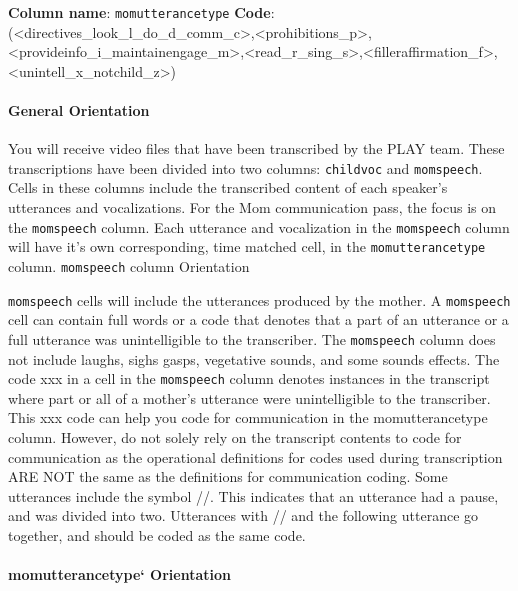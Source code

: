 \documentclass[
  12pt,
]{book}
\begin{document}
\textbf{Column name}: \texttt{momutterancetype}
\textbf{Code}: (\textless directives\_look\_l\_do\_d\_comm\_c\textgreater,\textless prohibitions\_p\textgreater,\textless provideinfo\_i\_maintainengage\_m\textgreater,\textless read\_r\_sing\_s\textgreater,\textless filleraffirmation\_f\textgreater,\textless unintell\_x\_notchild\_z\textgreater)

\hypertarget{general-orientation}{%
\paragraph*{General Orientation}\label{general-orientation}}

You will receive video files that have been transcribed by the PLAY team. These transcriptions have been divided into two columns: \texttt{childvoc} and \texttt{momspeech}. Cells in these columns include the transcribed content of each speaker's utterances and vocalizations. For the Mom communication pass, the focus is on the \texttt{momspeech} column. Each utterance and vocalization in the \texttt{momspeech} column will have it's own corresponding, time matched cell, in the \texttt{momutterancetype} column.
\texttt{momspeech} column Orientation

\texttt{momspeech} cells will include the utterances produced by the mother. A \texttt{momspeech} cell can contain full words or a code that denotes that a part of an utterance or a full utterance was unintelligible to the transcriber. The \texttt{momspeech} column does not include laughs, sighs gasps, vegetative sounds, and some sounds effects.
The code xxx in a cell in the \texttt{momspeech} column denotes instances in the transcript where part or all of a mother's utterance were unintelligible to the transcriber. This xxx code can help you code for communication in the momutterancetype column. However, do not solely rely on the transcript contents to code for communication as the operational definitions for codes used during transcription ARE NOT the same as the definitions for communication coding.
Some utterances include the symbol //. This indicates that an utterance had a pause, and was divided into two. Utterances with // and the following utterance go together, and should be coded as the same code.

\hypertarget{momutterancetype-orientation}{%
\paragraph*{momutterancetype` Orientation}\label{momutterancetype-orientation}}
\end{document}
